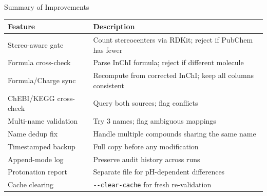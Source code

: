 \documentclass[aspectratio=169,11pt]{beamer}
\begin{document}
\begin{frame}{Summary of Improvements}

\begin{table}[h]
\centering
\footnotesize
\begin{tabular}{>{\raggedright}p{4.5cm}p{9cm}}
\toprule
\textbf{Feature} & \textbf{Description} \\
\midrule
Stereo-aware gate & Count stereocenters via RDKit; reject if PubChem has fewer \\
Formula cross-check & Parse InChI formula; reject if different molecule \\
Formula/Charge sync & Recompute from corrected InChI; keep all columns consistent \\
ChEBI/KEGG cross-check & Query both sources; flag conflicts \\
Multi-name validation & Try 3 names; flag ambiguous mappings \\
Name dedup fix & Handle multiple compounds sharing the same name \\
Timestamped backup & Full copy before any modification \\
Append-mode log & Preserve audit history across runs \\
Protonation report & Separate file for pH-dependent differences \\
Cache clearing & \texttt{-{}-clear-cache} for fresh re-validation \\
\bottomrule
\end{tabular}
\end{table}

\end{frame}
\end{document}
